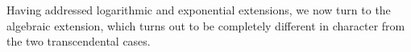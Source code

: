 

Having addressed logarithmic and exponential extensions, we now turn
to the algebraic extension, which turns out to be completely different
in character from the two transcendental cases.

\begin{comment}

To justify that statement, let's begin by trying to attack algebraic
extensions in the same manner as the two transcendental cases.

$$(\sum_i a_i \theta^i)' = \sum_i ( a_i' \theta^i + a_i (\theta^{i})')$$

Presumably, we know how to differentiate $\theta$, so let's write
$(\theta^i)' = \sum_j \psi_{i,j} \theta^j$:

$$(\sum_i a_i \theta^i)' = \sum_i ( a_i' \theta^i + a_i \sum_j \psi_{i,j} \theta^j)$$

Writing the $a_i$'s as a column vector $A$, we'll end up with a matrix equation:

$$I = A' + \Psi A$$

This is superficially similar to a Risch equation; it's a matrix Risch
equation.  To proceed in the same manner as before, we'd now have to
construct partial fractions expansions of everything and begin looking
at how cancellation might occur between our various components.  The
variety of possible cancelations between our terms seems daunting.

\vfill\eject

$$\int y\,dx \qquad y^2 = 4-x^2$$

Let's assume that our solution has the form $S = ay+b+\ln (cy+d)$, where $a$
and $b$ are rational functions in $x$ and $c$ is a polynomial in $x$.

$$S' = a' y + a y' + b' + \frac{c'y+cy'+d'}{cy+d}$$
$$2 y y' = -2x \qquad y' = -\frac{x}{y} = - \frac{x}{4-x^2}y$$
$$S' = y = (a' - a \frac{x}{4-x^2})y + b' + \frac{(c' - c \frac{x}{4-x^2})y+d}{cy+d}$$
$$S' = y = (a' - a \frac{x}{4-x^2})y + b' + \frac{(c' - c \frac{x}{4-x^2})y+d}{cy+d}\frac{cy-d}{cy-d}$$
$$S' = y = (a' - a \frac{x}{4-x^2})y + b' + \frac{(c' - c \frac{x}{4-x^2})cy^2+cdy -(c' - c \frac{x}{4-x^2})dy-d^2}{c^2y^2-d^2}$$
$$S' = y = (a' - a \frac{x}{4-x^2})y + b' + \frac{(c' - c \frac{x}{4-x^2})c(4-x^2)+cdy -(c' - c \frac{x}{4-x^2})dy-d^2}{c^2(4-x^2)-d^2}$$
$$S' = y = (a' - a \frac{x}{4-x^2})y + b' + \frac{(c'(4-x^2) - c x)c+cdy -(c' - c \frac{x}{4-x^2})dy-d^2}{c^2(4-x^2)-d^2}$$
$$S' = y = (a' - a \frac{x}{4-x^2} + \frac{cd-(c' - c \frac{x}{4-x^2})d}{c^2(4-x^2)-d^2})y + b' + \frac{(c'(4-x^2) - c x)c -d^2}{c^2(4-x^2)-d^2}$$


The correct answer is

$$S = 2i\ln(ix-y)+\frac{x}{2}y$$

Instead, we'll use a different approach...

\vfill\eject

\end{comment}

